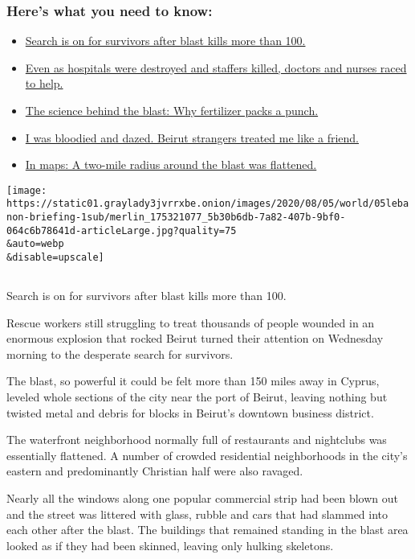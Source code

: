 \hypertarget{heres-what-you-need-to-know}{%
\subsubsection{Here's what you need to
know:}\label{heres-what-you-need-to-know}}

\begin{itemize}
\tightlist
\item
  \protect\hyperlink{link-480981c6}{Search is on for survivors after
  blast kills more than 100.}
\item
  \protect\hyperlink{link-a31c6f4}{Even as hospitals were destroyed and
  staffers killed, doctors and nurses raced to help.}
\item
  \protect\hyperlink{link-5d384d85}{The science behind the blast: Why
  fertilizer packs a punch.}
\item
  \protect\hyperlink{link-1fdae9ed}{I was bloodied and dazed. Beirut
  strangers treated me like a friend.}
\item
  \protect\hyperlink{link-1ba3fa3b}{In maps: A two-mile radius around
  the blast was flattened.}
\end{itemize}

\texttt{[image: https://static01.graylady3jvrrxbe.onion/images/2020/08/05/world/05lebanon-briefing-1sub/merlin\_175321077\_5b30b6db-7a82-407b-9bf0-064c6b78641d-articleLarge.jpg?quality=75\\\&auto=webp\\\&disable=upscale]}

\subsection{}

Search is on for survivors after blast kills more than 100.

Rescue workers still struggling to treat thousands of people wounded in
an enormous explosion that rocked Beirut turned their attention on
Wednesday morning to the desperate search for survivors.

The blast, so powerful it could be felt more than 150 miles away in
Cyprus, leveled whole sections of the city near the port of Beirut,
leaving nothing but twisted metal and debris for blocks in Beirut's
downtown business district.

The waterfront neighborhood normally full of restaurants and nightclubs
was essentially flattened. A number of crowded residential neighborhoods
in the city's eastern and predominantly Christian half were also
ravaged.

Nearly all the windows along one popular commercial strip had been blown
out and the street was littered with glass, rubble and cars that had
slammed into each other after the blast. The buildings that remained
standing in the blast area looked as if they had been skinned, leaving
only hulking skeletons.

